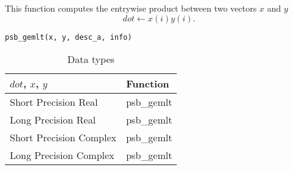 This function computes the entrywise product between two vectors $x$ and
$y$
\[dot \leftarrow x(i) y(i).\]

\begin{verbatim}
psb_gemlt(x, y, desc_a, info)
\end{verbatim}
\begin{table}[h]
	\begin{center}
		\begin{tabular}{ll}
			\hline
			$dot$, $x$, $y$ & {\bf Function}\\
			\hline
			Short Precision Real & psb\_gemlt \\
			Long Precision Real & psb\_gemlt \\
			Short Precision Complex & psb\_gemlt \\	
			Long Precision Complex & psb\_gemlt \\	
			\hline
		\end{tabular}
	\end{center}
	\caption{Data types\label{tab:f90mlt}}
\end{table}

